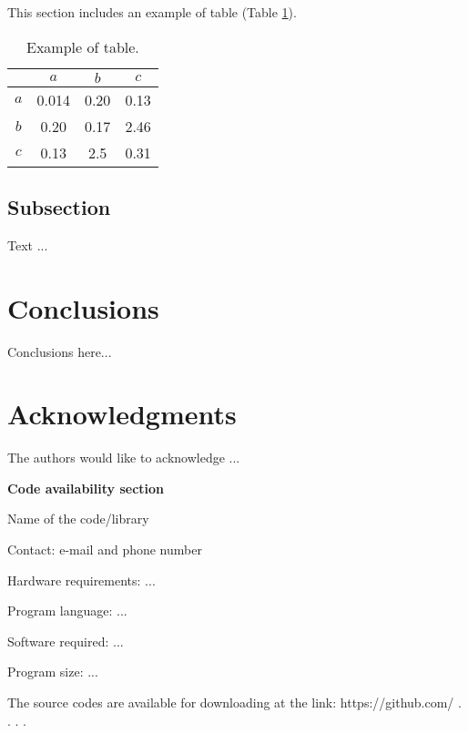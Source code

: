\documentclass[a4paper,fleqn]{cas-sc}
\begin{document}
This section includes an example of table (Table \ref{tab:Table1}).

\begin{table}
\centering
\caption{Example of table.}
\label{tab:Table1}
\begin{tabular}{ |c||c|c|c|} 
 \hline
     & $a$  &  $b$  &  $c$\\ 
 \hline 
 \hline
$a$ & 0.014 &  0.20    &   0.13  \\
\hline
$b$ & 0.20    &   0.17    &   2.46    \\
\hline
$c$ & 0.13    &   2.5     &   0.31   \\
\hline
\end{tabular} 
\end{table}


\subsection{Subsection}

Text ...

\section{Conclusions}

Conclusions here...

\section{Acknowledgments}

The authors would like to acknowledge ...

\newpage

\textbf{Code availability section}

Name of the code/library

Contact: e-mail and phone number

Hardware requirements: ...

Program language: ...
 
Software required: ...

Program size: ...

The source codes are available for downloading at the link:
https://github.com/ . . . . 



 
\end{document}
